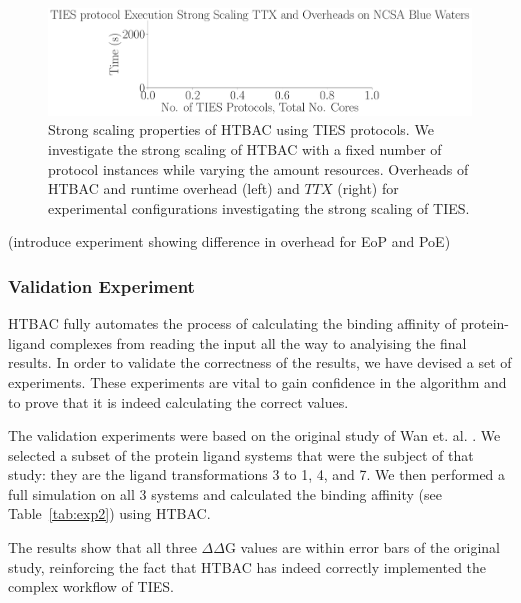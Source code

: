 \begin{figure}
  \centering
    \includegraphics[width=\columnwidth]{figures/ties_ss_pseudo.pdf}
    \caption{Strong scaling properties of HTBAC using TIES protocols. We
    investigate the strong scaling of HTBAC with a fixed number of protocol
    instances while varying the amount resources. Overheads of HTBAC and
    runtime overhead (left) and \(TTX\) (right) for experimental
    configurations investigating the strong scaling of TIES.}
\label{fig:strong_scaling_TIES}
\end{figure}


(introduce experiment showing difference in overhead for EoP and PoE)


\subsubsection{Validation Experiment}


HTBAC fully automates the process of calculating the binding affinity of
protein-ligand complexes from reading the input all the way to analyising the
final results. In order to validate the correctness of the results, we have
devised a set of experiments. These experiments are vital to gain confidence
in the algorithm and to prove that it is indeed calculating the correct
values.

The validation experiments were based on the original study of Wan et. al.
\cite{Wan2017brd4}. We selected a subset of the protein ligand systems that
were the subject of that study: they are the ligand transformations 3 to 1,
4, and 7. We then performed a full simulation on all 3 systems and calculated
the binding affinity (see Table~\ref{tab:exp2}) using HTBAC.

The results show that all three $\Delta \Delta$G values are within error bars
of the original study, reinforcing the fact that HTBAC has indeed correctly
implemented the complex workflow of TIES.

